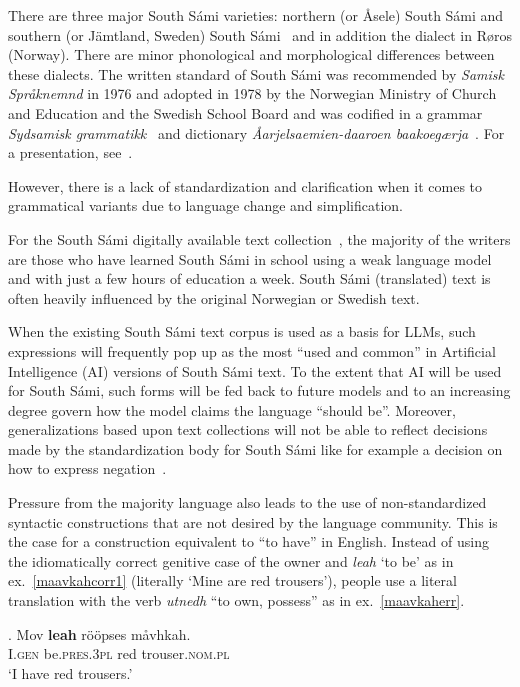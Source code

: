 \documentclass[free]{flammie}
\begin{document}
There are three major South Sámi varieties: northern (or Åsele) South Sámi and
southern (or Jämtland, Sweden) South Sámi~\cite[p.24]{Sammallahti1998saami} and in
addition the dialect in Røros (Norway). There are minor phonological and
morphological differences between these dialects. The written standard of South
Sámi was recommended by \textit{Samisk Språknemnd} in 1976 and adopted in 1978
by the Norwegian Ministry of Church and Education and the Swedish School Board
and was codified in a grammar \textit{Sydsamisk
grammatikk}~\cite{Bergsland1982sydsamisk} and dictionary \textit{Åarjelsaemien-daaroen
baakoegærja}~\cite{Bergsland1993aarjelsaemien}.  For a presentation,
see~\cite{wiechetek2023south}.

However, there is a lack of standardization and clarification when it comes to
grammatical variants due to language change and simplification.

For the South Sámi digitally available text collection~\cite{sikor}, the
majority of the writers are those who have learned South Sámi in school using a
weak language model and with just a few hours of education a week. South Sámi
(translated) text is often heavily influenced by the original Norwegian or
Swedish text.

When the existing South Sámi text corpus is used as a basis for LLMs, such
expressions will frequently pop up as the most ``used and common'' in Artificial
Intelligence (AI) versions of South Sámi text. To the extent that AI will be
used for South Sámi, such forms will be fed back to future models and to an
increasing degree govern how the model claims the language ``should be''.
Moreover, generalizations based upon text collections will not be able to
reflect decisions made by the standardization body for South Sámi like for
example a decision on how to express negation~\cite{mattssonmagga2009nektelse}.

Pressure from the majority language also leads to the use of non-standardized
syntactic constructions that are not desired by the language community. This is
the case for a construction equivalent to ``to have'' in English.  Instead of
using the idiomatically correct genitive case of the owner and \textit{leah} `to
be' as in ex.~\ref{maavkahcorr1} (literally `Mine are red trousers'), people use
a literal translation with the verb  \textit{utnedh} ``to own, possess'' as in
ex.~\ref{maavkaherr}.

\exg. Mov \textbf{leah} rööpses måvhkah.\label{maavkahcorr1}\\
 I\textsc{.gen} be\textsc{.pres.3pl} red trouser\textsc{.nom.pl}\\
`I have red trousers.'
\end{document}
